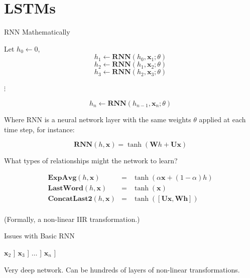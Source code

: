 \documentclass{beamer}
\newcommand{\boldx}{\mathbf{x}}
\newcommand{\boldW}{\mathbf{W}}
\newcommand{\boldh}{\boldsymbol{h}}
\begin{document}
\section{LSTMs}

\begin{frame}{RNN Mathematically}


  Let $h_0 \gets 0$, 
  \[ h_1 \gets \textbf{RNN}(h_{0}, \boldx_1;\theta) \] 
  \[ h_2 \gets \textbf{RNN}(h_{1}, \boldx_2;\theta) \] 
  \[ h_3 \gets \textbf{RNN}(h_{2}, \boldx_3;\theta) \] 
  \centerline{$\vdots$}
  \[ h_n \gets \textbf{RNN}(h_{n-1}, \boldx_n;\theta) \] 
  
  Where RNN is a neural network layer with the same weights $\theta$ applied 
  at each time step, for instance: 
  
  \[ \textbf{RNN}(h, \boldx) = \tanh(\boldW h + \mathbf{U} \boldx) \] 
\end{frame}


\begin{frame}
  What types of relationships  might  the network to learn?

  \begin{eqnarray*}
  \textbf{ExpAvg}(h, \boldx) &=& \tanh(\alpha\boldx + (1-\alpha) h) \\
   \textbf{LastWord}(h, \boldx) &=& \tanh(\boldx) \\
   \textbf{ConcatLast2}(h, \boldx) &=& \tanh([\textbf{U} \boldx, \boldW \boldh])\\
 \end{eqnarray*}
  
  (Formally, a non-linear IIR transformation.)
\end{frame}

\begin{frame}{Issues with Basic RNN}

  \begin{center}
    \Tree [ .$h_n$ [ .$\ldots$ [ .$h_3$ [ .$h_2$ [ .$h_1$ $h_0$ $\boldx_1$ ]
    $\boldx_2$ ] $\boldx_3$ ] $\ldots$ ] $\boldx_n$ ]
  \end{center}

  Very deep network. Can be hundreds of layers of non-linear transformations.
  
\end{frame}
\end{document}
